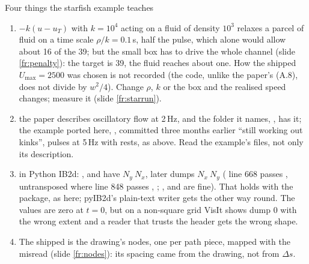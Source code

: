 \documentclass[aspectratio=169,11pt]{beamer}
\begin{document}
\begin{frame}{Four things the starfish example teaches}
\label{fr:lessons}
\footnotesize
\begin{enumerate}
  \item {} $-k(u - u_T)$ with $k = 10^4$ acting on a fluid of density $10^3$ relaxes a parcel of fluid on a time scale $\rho/k = 0.1$\,s, half the pulse, which alone would allow about 16 of the 39; but the small box has to drive the whole channel (slide \ref{fr:penalty}): the target is 39, the fluid reaches about one. How the shipped $U_{\max} = 2500$ was chosen is not recorded (the code, unlike the paper's (A.8), does not divide by $w^2/4$). Change $\rho$, $k$ or the box and the realised speed changes; measure it (slide \ref{fr:starrun}).
  \item {} the paper describes oscillatory flow at 2\,Hz, and the folder it names, , has it; the example ported here, , committed three months earlier ``still working out kinks'', pulses at 5\,Hz with rests, as above. Read the example's files, not only its description.
  \item {} in Python IB2d: ,  and  have  $N_y\ N_x$, later dumps $N_x\ N_y$ ( line 668 passes ,  untransposed where line 848 passes , ; ,  and  are fine). That holds with the  package, as here; pyIB2d's plain-text writer gets  the other way round. The values are zero at $t = 0$, but on a non-square grid VisIt shows dump 0 with the wrong extent and a reader that trusts the header gets the wrong shape.
  \item {} The shipped  is the drawing's nodes, one per path piece, mapped with the  misread (slide \ref{fr:nodes}): its spacing came from the drawing, not from $\Delta s$.
\end{enumerate}
\end{frame}
\end{document}
